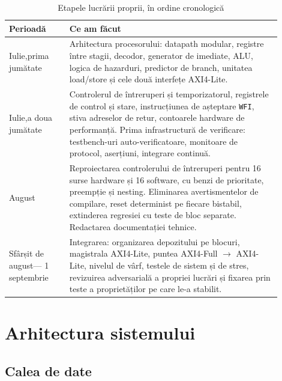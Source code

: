 \documentclass[11pt,openany]{report}
\newcommand{\sig}[1]{\texttt{#1}}
\begin{document}
\begin{table}[H]
\centering
\caption{Etapele lucrării proprii, în ordine cronologică}
\label{tab:etape}
\small
\begin{tabular}{@{}L{0.20\linewidth}L{0.70\linewidth}@{}}
\toprule
\textbf{Perioadă} & \textbf{Ce am făcut} \\
\midrule
Iulie,\newline prima jumătate &
  Arhitectura procesorului: datapath modular, registre între stagii, decodor,
  generator de imediate, ALU, logica de hazarduri, predictor de branch, unitatea
  load/store și cele două interfețe AXI4-Lite. \\
\addlinespace
Iulie,\newline a doua jumătate &
  Controlerul de întreruperi și temporizatorul, registrele de control și stare,
  instrucțiunea de așteptare \sig{WFI}, stiva adreselor de retur, contoarele
  hardware de performanță. Prima infrastructură de verificare: testbench-uri
  auto-verificatoare, monitoare de protocol, aserțiuni, integrare continuă. \\
\addlinespace
August &
  Reproiectarea controlerului de întreruperi pentru 16 surse hardware și 16
  software, cu benzi de prioritate, preempție și nesting. Eliminarea
  avertismentelor de compilare, reset determinist pe fiecare bistabil,
  extinderea regresiei cu teste de bloc separate. Redactarea documentației
  tehnice. \\
\addlinespace
Sfârșit de august\newline --- 1 septembrie &
  Integrarea: organizarea depozitului pe blocuri, magistrala AXI4-Lite, puntea
  AXI4-Full $\rightarrow$ AXI4-Lite, nivelul de vârf, testele de sistem și de
  stres, revizuirea adversarială a propriei lucrări și fixarea prin teste a
  proprietăților pe care le-a stabilit. \\
\bottomrule
\end{tabular}
\end{table}

\chapter{Arhitectura sistemului}
\label{ch:arhitectura}

\section{Calea de date}
\end{document}
